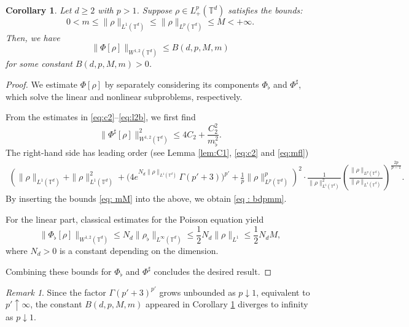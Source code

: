 \documentclass[11pt,reqno,a4paper]{amsart}
\newtheorem{corollary}[lemma]{Corollary}
\theoremstyle{definition}
\theoremstyle{remark}
\newtheorem{remark}[lemma]{Remark}
\numberwithin{equation}{section}
\newcommand{\T} {\mathbb T}
\newcommand{\lt}{\left}
\newcommand{\rt}{\right}
\begin{document}
\begin{corollary}\label{cor:w12b}
Let $d\ge 2$ with $p>1$. Suppose $\rho \in L^p_+(\T^d)$ satisfies the bounds: 
\begin{equation}
\label{eq: mM}
0<m \le \|\rho\|_{L^1(\T^d)} \le \|\rho\|_{L^p(\T^d)} \le M<+\infty.
\end{equation}
Then, we have
\begin{equation}
\label{eq : bdpmm}
\|\Phi[\rho]\|_{W^{1,2}(\T^d)} \le B(d,p,M,m)
\end{equation}
for some constant $B(d,p,M,m)>0$.
\end{corollary}
\begin{proof}
We estimate $\Phi[\rho]$ by separately considering its components $\Phi_\flat$ and $\Phi^\sharp$, which solve the linear and nonlinear subproblems, respectively. 

From the estimates in \eqref{eq:c2}--\eqref{eq:l2b}, we first find 
\[
\|\Phi^\sharp[\rho]\|_{W^{1,2}(\T^d)}^2 \le 4C_2 + \frac{C_2^2}{m_\flat^2}.
\]
The right-hand side has leading order (see Lemma \ref{lem:C1}, \eqref{eq:c2} and \eqref{eq:mfl})
\begin{align*}
    \left(\|\rho\|_{L^1(\T^d)} + \|\rho\|_{L^1(\T^d)}^2 + \Big(4e^{N_d \|\rho\|_{L^1(\T^d)}}\Gamma(p'+3)\Big)^{p'} +\frac{1}{p}\|\rho\|_{L^p(\T^d)}^p \right)^2 \cdot \frac{1}{\|\rho\|^2_{L^1(\T^d)}}\lt(\frac{\|\rho\|_{L^p(\T^d)}}{\|\rho\|_{L^1(\T^d)}}\rt)^{\frac{2p}{p-1}}.
\end{align*}
By inserting the bounds \eqref{eq: mM} into the above, we obtain \eqref{eq : bdpmm}. %

For the linear part, classical estimates for the Poisson equation yield
\[
\|\Phi_\flat[\rho]\|_{W^{1,2}(\T^d)}\le N_d\|\rho_{\flat}\|_{L^\infty(\T^d)} \le \frac{1}{2}N_d \|\rho\|_{L^1} \le \frac{1}{2}N_d M,
\]
where $N_d > 0$ is a constant depending on the dimension.

Combining these bounds for $\Phi_\flat$ and $\Phi^\sharp$ concludes the desired result.
\end{proof}

\begin{remark} Since the factor $\Gamma(p'+3)^{p'}$ grows unbounded as $p \downarrow 1$, equivalent to $p' \uparrow \infty$, the constant $B(d,p,M,m)$ appeared in Corollary \ref{cor:w12b} diverges to infinity as  $p \downarrow 1$.
\end{remark}
\end{document}
